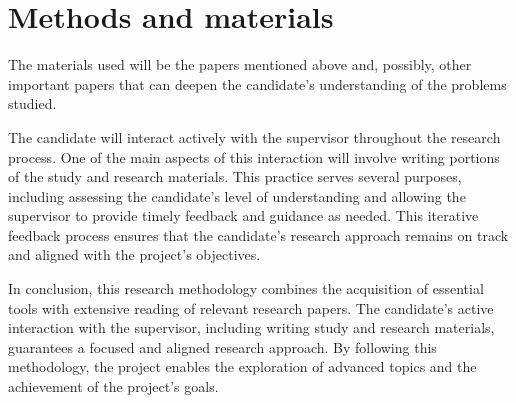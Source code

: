 \documentclass[12pt]{article}
\begin{document}
\section{Methods and materials}
The materials used will be the papers mentioned above and, possibly, other important papers that can deepen the candidate’s understanding of the problems studied.

The candidate will interact actively with the supervisor throughout the research process. 
One of the main aspects of this interaction will involve writing portions of the study and research materials. 
This practice serves several purposes, including assessing the candidate’s level of understanding and allowing the supervisor to provide timely feedback and guidance as needed. 
This iterative feedback process ensures that the candidate’s research approach remains on track and aligned with the project’s objectives.

In conclusion, this research methodology combines the acquisition of essential tools with extensive reading of relevant research papers. 
The candidate’s active interaction with the supervisor, including writing study and research materials, guarantees a focused and aligned research approach. 
By following this methodology, the project enables the exploration of advanced topics and the achievement of the project’s goals.
\end{document}
